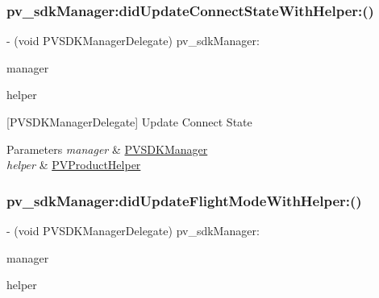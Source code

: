 \subsubsection{\texorpdfstring{pv\+\_\+sdk\+Manager\+:did\+Update\+Connect\+State\+With\+Helper\+:()}{pv\_sdkManager:didUpdateConnectStateWithHelper:()}}
{\footnotesize\ttfamily -\/ (void P\+V\+S\+D\+K\+Manager\+Delegate) pv\+\_\+sdk\+Manager\+: \begin{DoxyParamCaption}\item[{(\hyperlink{interface_p_v_s_d_k_manager}{P\+V\+S\+D\+K\+Manager} $\ast$)}]{manager }\item[{didUpdateConnectStateWithHelper:(\hyperlink{interface_p_v_product_helper}{P\+V\+Product\+Helper} $\ast$)}]{helper }\end{DoxyParamCaption}\hspace{0.3cm}{\ttfamily [required]}}

\mbox{[}P\+V\+S\+D\+K\+Manager\+Delegate\mbox{]} Update Connect State


\begin{DoxyParams}{Parameters}
{\em manager} & \hyperlink{interface_p_v_s_d_k_manager}{P\+V\+S\+D\+K\+Manager} \\
\hline
{\em helper} & \hyperlink{interface_p_v_product_helper}{P\+V\+Product\+Helper} \\
\hline
\end{DoxyParams}
\mbox{\label{protocol_p_v_s_d_k_manager_delegate_01-p_aa368c839d7e0cac83177e5d8298d89b3}} 
\subsubsection{\texorpdfstring{pv\+\_\+sdk\+Manager\+:did\+Update\+Flight\+Mode\+With\+Helper\+:()}{pv\_sdkManager:didUpdateFlightModeWithHelper:()}}
{\footnotesize\ttfamily -\/ (void P\+V\+S\+D\+K\+Manager\+Delegate) pv\+\_\+sdk\+Manager\+: \begin{DoxyParamCaption}\item[{(\hyperlink{interface_p_v_s_d_k_manager}{P\+V\+S\+D\+K\+Manager} $\ast$)}]{manager }\item[{didUpdateFlightModeWithHelper:(\hyperlink{interface_p_v_flight_helper}{P\+V\+Flight\+Helper} $\ast$)}]{helper }\end{DoxyParamCaption}\hspace{0.3cm}{\ttfamily [optional]}}

